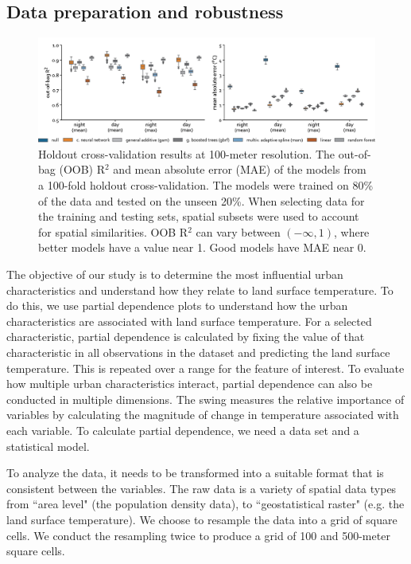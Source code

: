 \documentclass[final,3p,times,twocolumn,sort&compress]{elsarticle}
\begin{document}
\subsection{Data preparation and robustness}
\begin{figure}
    \centering
    \includegraphics[width=\linewidth]{fig/report/holdout_100.png}
    \caption[Holdout cross-validation results at 100-meter resolution]{
    Holdout cross-validation results at 100-meter resolution.
    The out-of-bag (OOB) R$^2$ and mean absolute error (MAE) of the models from a 100-fold holdout cross-validation. 
    The models were trained on 80\% of the data and tested on the unseen 20\%.
    When selecting data for the training and testing sets, spatial subsets were used to account for spatial similarities. 
    OOB R$^2$ can vary between $(-\infty, 1)$, where better models have a value near 1. 
    Good models have MAE near 0.
    }
    \label{fig:holdout_100}
\end{figure}

The objective of our study is to determine the most influential urban characteristics and understand how they relate to land surface temperature.
To do this, we use partial dependence plots to understand how the urban characteristics are associated with land surface temperature.
For a selected characteristic, partial dependence is calculated by fixing the value of that characteristic in all observations in the dataset and predicting the land surface temperature. 
This is repeated over a range for the feature of interest.
To evaluate how multiple urban characteristics interact, partial dependence can also be conducted in multiple dimensions.
The swing \cite{Shortridge2015-ub} measures the relative importance of variables by calculating the magnitude of change in temperature associated with each variable.
To calculate partial dependence, we need a data set and a statistical model.

To analyze the data, it needs to be transformed into a suitable format that is consistent between the variables.
The raw data is a variety of spatial data types from ``area level" (the population density data), to ``geostatistical raster" (e.g. the land surface temperature).
We choose to resample the data into a grid of square cells.
We conduct the resampling twice to produce a grid of 100 and 500-meter square cells. 
\end{document}

